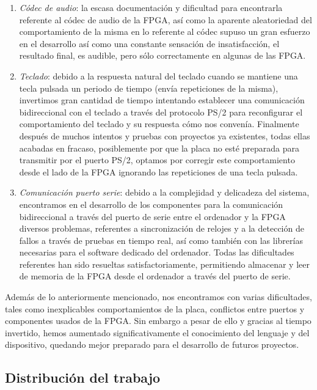 \documentclass{article}
\begin{document}
\begin{enumerate}
	\item {\itshape Códec de audio}: la escasa documentación y dificultad para encontrarla referente al códec de audio de la FPGA, así como la aparente aleatoriedad del comportamiento de la misma en lo referente al códec supuso un gran esfuerzo en el desarrollo así como una constante sensación de insatisfacción, el resultado final, es audible, pero sólo correctamente en algunas de las FPGA.

	\item {\itshape Teclado}: debido a la respuesta natural del teclado cuando se mantiene una tecla pulsada un periodo de tiempo (envía repeticiones de la misma), invertimos gran cantidad de tiempo intentando establecer una comunicación bidireccional con el teclado a través del protocolo PS/2 para reconfigurar el comportamiento del teclado y su respuesta cómo nos convenía. Finalmente después de muchos intentos y pruebas con proyectos ya existentes, todas ellas acabadas en fracaso, posiblemente por que la placa no esté preparada para transmitir por el puerto PS/2, optamos por corregir este comportamiento desde el lado de la FPGA ignorando las repeticiones de una tecla pulsada.

	\item {\itshape Comunicación puerto serie}: debido a la complejidad y delicadeza del sistema, encontramos en el desarrollo de los componentes para la comunicación bidireccional a través del puerto de serie entre el ordenador y la FPGA diversos problemas, referentes a sincronización de relojes y a la detección de fallos a través de pruebas en tiempo real, así como también con las librerías necesarias para el software dedicado del ordenador.
	Todas las dificultades referentes han sido resueltas satisfactoriamente, permitiendo almacenar y leer de memoria de la FPGA desde el ordenador a través del puerto de serie.
\end{enumerate}

Además de lo anteriormente mencionado, nos encontramos con varias dificultades, tales como inexplicables comportamientos de la placa, conflictos entre puertos y componentes usados de la FPGA.
Sin embargo a pesar de ello y gracias al tiempo invertido, hemos aumentado significativamente el conocimiento del lenguaje y del dispositivo, quedando mejor preparado para el desarrollo de futuros proyectos.

\subsection{Distribución del trabajo}
\end{document}
